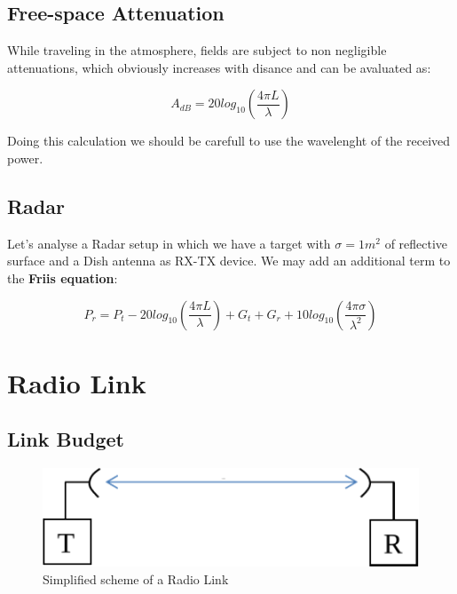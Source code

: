 \subsection{Free-space Attenuation} %
\label{sub:free_space_attenuation}

While traveling in the atmosphere, fields are subject to non negligible attenuations, which obviously increases with disance and can be avaluated as:

\begin{equation}
	A_{dB} = 20log_{10} \left( \frac{4 \pi L}{\lambda} \right)
\end{equation}

Doing this calculation we should be carefull to use the wavelenght of the received power.

\subsection{Radar} %
\label{sub:radar}

Let's analyse a Radar setup in which we have a target with $\sigma = 1m^2$ of reflective surface and a Dish antenna as RX-TX device.
We may add an additional term to the \textbf{Friis equation}:

\begin{equation}
	P_r= P_t - 20log_{10}\left( \frac{4\pi L}{\lambda}\right)+ G_t +G_r + 10log_{10}\left( \frac{4 \pi \sigma}{\lambda^2}\right)
\end{equation}







\section{Radio Link} %
\label{sec:radio_link}


\subsection{Link Budget} %
\label{sub:link_budget}

\begin{figure}[h]
	\centering
	\includegraphics[scale=0.6]{Immagini/link}
	
	\caption{Simplified scheme of a Radio Link}
	\label{fig:link}
\end{figure}

